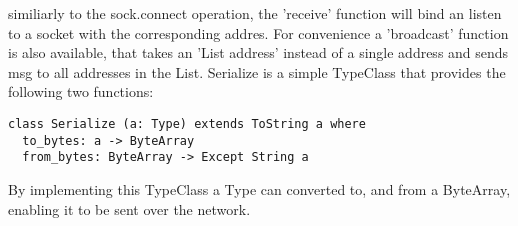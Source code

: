 \documentclass[
	ngerman,
	ruledheaders=section,%
	class=report,%
	thesis={type=master},%
	accentcolor=9c,%
	custommargins=true,%
	marginpar=false,%
	parskip=half-,%
	fontsize=11pt,%
]{tudapub}
\begin{document}
similiarly to the sock.connect operation, the 'receive' function will bind an listen to a socket with the corresponding addres. For convenience a 'broadcast' function is also available, that takes an 'List address' instead of a single address and sends msg to all addresses in the List.
\newline
Serialize is a simple TypeClass that provides the following two functions:
\begin{lstlisting}[language=lean]
class Serialize (a: Type) extends ToString a where
  to_bytes: a -> ByteArray
  from_bytes: ByteArray -> Except String a
\end{lstlisting}
By implementing this TypeClass a Type can converted to, and from a ByteArray, enabling it to be sent over the network.



\printbibliography
\end{document}
